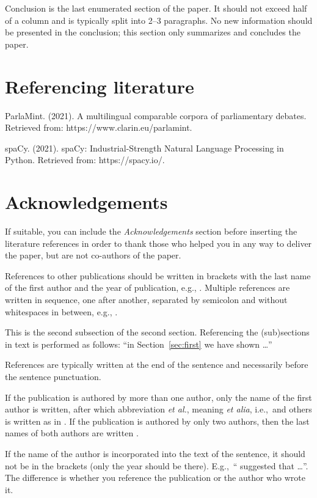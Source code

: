 \documentclass[10pt, a4paper]{article}
\begin{document}
Conclusion is the last enumerated section of the paper. It should not exceed half of a column and is typically split into 2--3 paragraphs. No new information should be presented in the conclusion; this section only summarizes and concludes the paper.

\section{Referencing literature}

ParlaMint. (2021). A multilingual comparable corpora of parliamentary debates. Retrieved from: https://www.clarin.eu/parlamint.

spaCy. (2021). spaCy: Industrial-Strength Natural Language Processing in Python. Retrieved from: https://spacy.io/.

\section*{Acknowledgements}

If suitable, you can include the \textit{Acknowledgements} section before inserting the literature references  in order to thank those who helped you in any way to deliver the paper, but are not co-authors of the paper.

References to other publications should be written in brackets with the last name of the first author and the year of publication, e.g., \citep{chomsky-73}.  Multiple references are written in sequence, one after another, separated by semicolon and without whitespaces in between, e.g., \citep{chomsky-73,chave-64,feigl-58}. 

This is the second subsection of the second section. Referencing the (sub)sections in text is performed as follows: ``in Section~\ref{sec:first} we have shown \dots''

References are typically written at the end of the sentence and necessarily before the sentence punctuation.

If the publication is authored by more than one author, only the name of the first author is written, after which abbreviation \emph{et al.}, meaning \emph{et alia}, i.e.,~and others is written as in \citep{johnson-etc}. If the publication is authored by only two authors, then the last names of both authors are written \citep{johnson-howells}.

If the name of the author is incorporated into the text of the sentence, it should not be in the brackets (only the year should be there). E.g.,~``\citet{chomsky-73}
suggested that \dots''. The difference is whether you reference the publication or the author who wrote it. 
\end{document}
